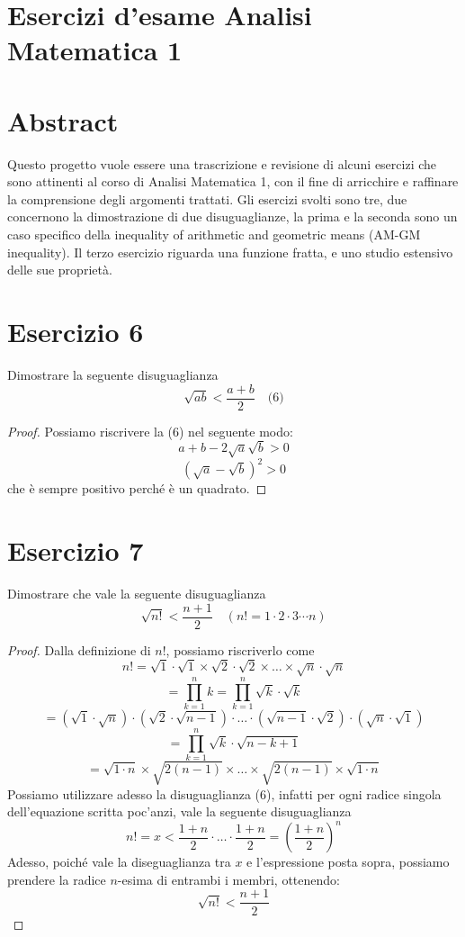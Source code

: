 \documentclass{article}
\begin{document}
\section*{Esercizi d’esame Analisi Matematica 1}



\section*{Abstract  }
Questo progetto vuole essere una trascrizione e revisione di alcuni esercizi che sono attinenti al corso di Analisi Matematica 1, con il fine di arricchire e raffinare la comprensione degli argomenti trattati. Gli esercizi svolti sono tre, due concernono la dimostrazione di due disuguaglianze, la prima e la seconda sono un caso specifico della inequality of arithmetic and geometric means (AM-GM inequality). Il terzo esercizio riguarda una funzione fratta, e uno studio estensivo delle sue proprietà.

\section*{Esercizio 6}
Dimostrare la seguente disuguaglianza
\[
\sqrt{ab} < \frac{a+b}{2} \quad \text{(6)}
\]
\begin{proof}
    Possiamo riscrivere la (6) nel seguente modo:
    \[
    a + b - 2\sqrt{a}\sqrt{b} > 0
    \]
    \[
    (\sqrt{a} - \sqrt{b})^2 > 0
    \]
    che è sempre positivo perché è un quadrato.
\end{proof}

\section*{Esercizio 7}
Dimostrare che vale la seguente disuguaglianza
\[
\sqrt{n!} < \frac{n+1}{2} \quad (n! = 1 \cdot 2 \cdot 3 \cdots n)
\]
\begin{proof}
    Dalla definizione di \(n!\), possiamo riscriverlo come
    \[
    n! = \sqrt{1} \cdot \sqrt{1} \times \sqrt{2} \cdot \sqrt{2} \times \ldots \times \sqrt{n} \cdot \sqrt{n}
    \]
    \[
    = \prod_{k=1}^{n} k = \prod_{k=1}^{n} \sqrt{k} \cdot \sqrt{k}
    \]
    \[
    = (\sqrt{1} \cdot \sqrt{n}) \cdot (\sqrt{2} \cdot \sqrt{n-1}) \cdot \ldots \cdot (\sqrt{n-1} \cdot \sqrt{2}) \cdot (\sqrt{n} \cdot \sqrt{1})
    \]
    \[
    = \prod_{k=1}^{n} \sqrt{k} \cdot \sqrt{n-k+1}
    \]
    \[
    = \sqrt{1 \cdot n} \times \sqrt{2(n-1)} \times \ldots \times \sqrt{2(n-1)} \times \sqrt{1 \cdot n} 
    \]
    Possiamo utilizzare adesso la disuguaglianza (6), infatti per ogni radice singola dell’equazione scritta poc’anzi, vale la seguente disuguaglianza
    \[
    n! = x < \frac{1+n}{2} \cdot \ldots \cdot \frac{1+n}{2} = \left(\frac{1+n}{2}\right)^n
    \]
    Adesso, poiché vale la diseguaglianza tra \(x\) e l’espressione posta sopra, possiamo prendere la radice \(n\)-esima di entrambi i membri, ottenendo:
    \[
    \sqrt{n!} < \frac{n+1}{2}
    \]
\end{proof}
\end{document}
